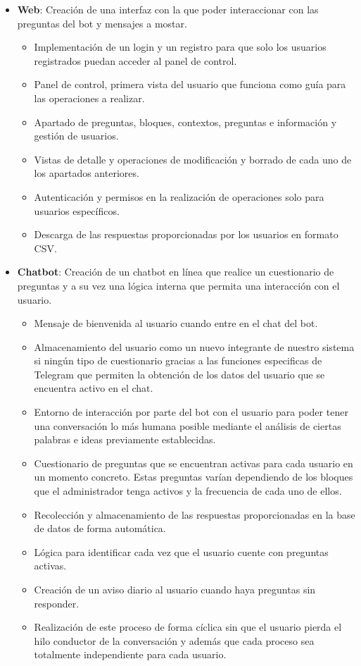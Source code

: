 \begin{itemize}
\item \textbf{Web}: Creación de una interfaz con la que poder interaccionar con las preguntas del bot y mensajes a mostar.
\begin{itemize}
\item Implementación de un login y un registro para que solo los usuarios registrados puedan acceder al panel de control.
\item Panel de control, primera vista del usuario que funciona como guía para las operaciones a realizar.
\item Apartado de preguntas, bloques, contextos, preguntas e información y gestión de usuarios.
\item Vistas de detalle y operaciones de modificación y borrado de cada uno de los apartados anteriores.
\item Autenticación y permisos en la realización de operaciones solo para usuarios específicos.
\item Descarga de las respuestas proporcionadas por los usuarios en formato CSV.

\end{itemize}
\item \textbf{Chatbot}: Creación de un chatbot en línea que realice un cuestionario de preguntas y a su vez una lógica interna que permita una interacción con el usuario.
\begin{itemize}
\item Mensaje de bienvenida al usuario cuando entre en el chat del bot.
\item Almacenamiento del usuario como un nuevo integrante de nuestro sistema si ningún tipo de cuestionario gracias a las funciones especificas de Telegram que permiten la obtención de los datos del usuario que se encuentra activo en el chat.
\item Entorno de interacción por parte del bot con el usuario para poder tener una conversación lo más humana posible mediante el análisis de ciertas palabras e ideas previamente establecidas.
\item Cuestionario de preguntas que se encuentran activas para cada usuario en un momento concreto. Estas preguntas varían dependiendo de los bloques que el administrador tenga activos y la frecuencia de cada uno de ellos.
\item Recolección y almacenamiento de las respuestas proporcionadas en la base de datos de forma automática.
\item Lógica para identificar cada vez que el usuario cuente con preguntas activas.
\item Creación de un aviso diario al usuario cuando haya preguntas sin responder.
\item Realización de este proceso de forma cíclica sin que el usuario pierda el hilo conductor de la conversación y además que cada proceso sea totalmente independiente para cada usuario.
\end{itemize}
\end{itemize}
